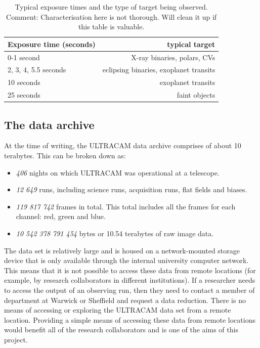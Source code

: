 \begin{table}
  \begin{center}
	\begin{tabular}{|l|r|}
		\hline
		Exposure time (seconds) & typical target \\
		\hline
		0-1 second & X-ray binaries, polars, CVs \\
		2, 3, 4, 5.5 seconds & eclipsing binaries, exoplanet transits \\
		10 seconds & exoplanet transits \\
		25 seconds & faint objects \\
		\hline
	\end{tabular}
  \end{center}
\label{tab:breakdown}
\caption{Typical exposure times and the type of target being observed. Comment: Characterisation here is not thorough. Will clean it up if this table is valuable.
}
\end{table}

\subsection{The data archive}
At the time of writing, the ULTRACAM data archive comprises of about 10 terabytes. This can be broken down as:
\begin{itemize}
	\item \emph{406} nights on which ULTRACAM was operational at a telescope.
	\item \emph{12 649} runs, including science runs, acquisition runs, flat fields and biases. 
	\item \emph{119 817 742} frames in total. This total includes all the frames for each channel: red, green and blue.
	\item \emph{10 542 378 791 454} bytes or 10.54 terabytes of raw image data.
\end{itemize} 

The data set is relatively large and is housed on a network-mounted storage device that is only available through the internal university computer network. This means that it is not possible to access these data from remote locations (for example, by research collaborators in different institutions). If a researcher needs to access the output of an observing run, then they need to contact a member of department at Warwick or Sheffield and request a data reduction. There is no means of accessing or exploring the ULTRACAM data set from a remote location. Providing a simple means of accessing these data from remote locations would benefit all of the research collaborators and is one of the aims of this project.


